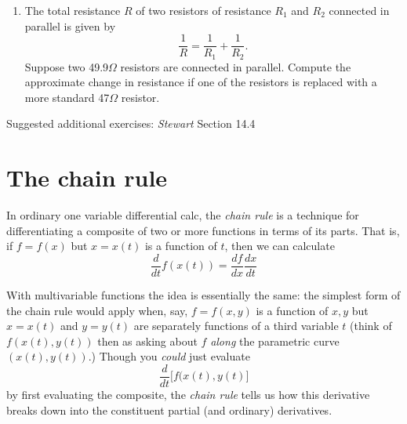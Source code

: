 \documentclass[12pt]{article}
\numberwithin{equation}{subsection}
\numberwithin{figure}{subsection}
\theoremstyle{note}
\begin{document}
{\begin{enumerate}[label=\arabic*.]


\item The total resistance $R$ of two resistors of resistance $R_1$ and $R_2$ connected in parallel is given by \[ \dfrac{1}{R}=\dfrac{1}{R_1}+\dfrac{1}{R_2}.\] Suppose two 49.9$\Omega$ resistors are connected in parallel. Compute the approximate change in resistance if one of the resistors is replaced with a more standard 47$\Omega$ resistor. 
\end{enumerate}



Suggested additional exercises: \textit{Stewart} Section 14.4 


\section{The chain rule}

In ordinary one variable differential calc, the \textit{chain rule} is a technique for differentiating a composite of two or more functions in terms of its parts. That is, if $f=f(x)$ but $x=x(t)$ is a function of $t$, then we can calculate \begin{equation} \dfrac{d}{dt} f(x(t))= \dfrac{df}{dx} \dfrac{dx}{dt}\end{equation}

With multivariable functions the idea is essentially the same: the simplest form of the chain rule would apply when, say, $f=f(x,y)$ is a function of $x,y$ but $x=x(t)$ and $y=y(t)$ are separately functions of a third variable $t$ (think of $f(x(t),y(t))$ then as asking about $f$ \textit{along} the parametric curve $(x(t),y(t))$.) Though you \textit{could} just evaluate \[\dfrac{d}{dt} \lbrack f(x(t),y(t)\rbrack\] by first evaluating the composite, the \textit{chain rule} tells us how this derivative breaks down into the constituent partial (and ordinary) derivatives. 

}
\end{document}
